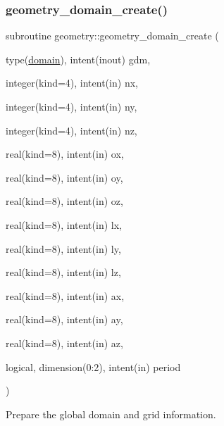 \subsubsection{\texorpdfstring{geometry\+\_\+domain\+\_\+create()}{geometry\_domain\_create()}}
{\footnotesize\ttfamily subroutine geometry\+::geometry\+\_\+domain\+\_\+create (\begin{DoxyParamCaption}\item[{type(\hyperlink{structgeometry_1_1domain}{domain}), intent(inout)}]{gdm,  }\item[{integer(kind=4), intent(in)}]{nx,  }\item[{integer(kind=4), intent(in)}]{ny,  }\item[{integer(kind=4), intent(in)}]{nz,  }\item[{real(kind=8), intent(in)}]{ox,  }\item[{real(kind=8), intent(in)}]{oy,  }\item[{real(kind=8), intent(in)}]{oz,  }\item[{real(kind=8), intent(in)}]{lx,  }\item[{real(kind=8), intent(in)}]{ly,  }\item[{real(kind=8), intent(in)}]{lz,  }\item[{real(kind=8), intent(in)}]{ax,  }\item[{real(kind=8), intent(in)}]{ay,  }\item[{real(kind=8), intent(in)}]{az,  }\item[{logical, dimension(0\+:2), intent(in)}]{period }\end{DoxyParamCaption})}



Prepare the global domain and grid information. 


